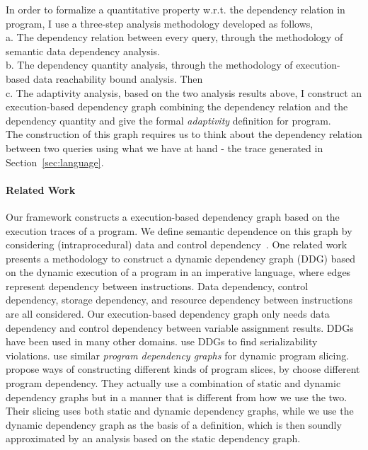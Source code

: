 
In order to formalize a quantitative property w.r.t. the dependency relation in program, I
use a three-step analysis methodology developed as follows,
\\
 a. The dependency relation between every query, through the methodology of semantic data dependency analysis.
\\
 b. The dependency quantity analysis, through the methodology of execution-based data reachability bound analysis. Then 
\\
 c. The adaptivity analysis, based on the two analysis results above, 
 I construct an execution-based dependency graph combining the dependency relation and the dependency quantity
    and give the formal \emph{adaptivity} definition 
    for program.
\\
The construction of this graph requires us to think about the dependency relation between two queries using what we have at hand - 
the trace generated in Section~\ref{sec:language}. 
 \paragraph*{Related Work}
 {
Our framework constructs a execution-based dependency graph based on the execution traces of a program. We define semantic dependence on this graph by considering (intraprocedural) data and control dependency~\cite{bilardi1996framework,cytron1991efficiently,pollock1989incremental}.    
One related work  
\cite{austin1992dynamic} presents a methodology to construct a dynamic dependency graph (DDG) based on the dynamic execution of a program in an imperative language, where edges represent dependency between instructions. Data dependency, control dependency, storage dependency, and resource dependency between instructions are all considered. Our execution-based dependency graph only needs data dependency and control dependency between variable assignment results. 
%
DDGs have been used in many other domains. \cite{nagar2018automated} use DDGs to find serializability violations. \cite{hammer2006dynamic} use similar \emph{program dependency graphs} \cite{ferrante1987program} for dynamic program slicing.
\cite{mastroeni2008data} propose ways of constructing different kinds of program slices, by choose different program dependency. 
They actually use a combination of  
static and dynamic dependency graphs but in a manner that is different from how we use the two. Their slicing uses both static and dynamic dependency graphs, while we use the dynamic dependency graph as the basis of a definition, which is then soundly approximated by an analysis based on the static dependency graph.}

